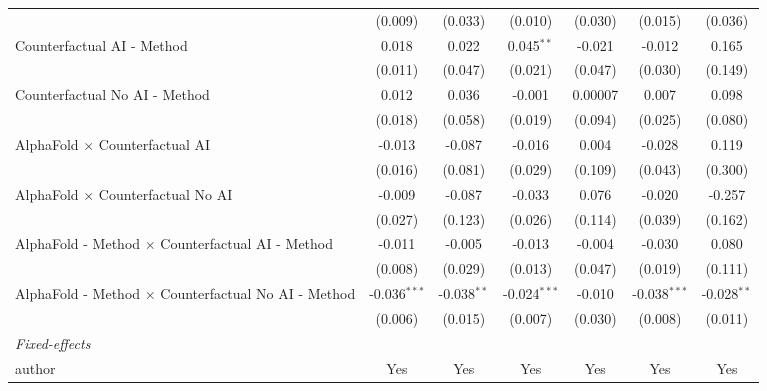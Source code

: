 \begin{tabular}{lcccccc}
                                                              & (0.009)        & (0.033)       & (0.010)        & (0.030) & (0.015)        & (0.036)\\   
   Counterfactual AI - Method                                 & 0.018          & 0.022         & 0.045$^{**}$   & -0.021  & -0.012         & 0.165\\   
                                                              & (0.011)        & (0.047)       & (0.021)        & (0.047) & (0.030)        & (0.149)\\   
   Counterfactual No AI - Method                              & 0.012          & 0.036         & -0.001         & 0.00007 & 0.007          & 0.098\\   
                                                              & (0.018)        & (0.058)       & (0.019)        & (0.094) & (0.025)        & (0.080)\\   
   AlphaFold $\times$ Counterfactual AI                       & -0.013         & -0.087        & -0.016         & 0.004   & -0.028         & 0.119\\   
                                                              & (0.016)        & (0.081)       & (0.029)        & (0.109) & (0.043)        & (0.300)\\   
   AlphaFold $\times$ Counterfactual No AI                    & -0.009         & -0.087        & -0.033         & 0.076   & -0.020         & -0.257\\   
                                                              & (0.027)        & (0.123)       & (0.026)        & (0.114) & (0.039)        & (0.162)\\   
   AlphaFold - Method $\times$ Counterfactual AI - Method     & -0.011         & -0.005        & -0.013         & -0.004  & -0.030         & 0.080\\   
                                                              & (0.008)        & (0.029)       & (0.013)        & (0.047) & (0.019)        & (0.111)\\   
   AlphaFold - Method $\times$ Counterfactual No AI - Method  & -0.036$^{***}$ & -0.038$^{**}$ & -0.024$^{***}$ & -0.010  & -0.038$^{***}$ & -0.028$^{**}$\\   
                                                              & (0.006)        & (0.015)       & (0.007)        & (0.030) & (0.008)        & (0.011)\\   
   \midrule
   \emph{Fixed-effects}\\
   author                                                     & Yes            & Yes           & Yes            & Yes     & Yes            & Yes\\  

\end{tabular}

